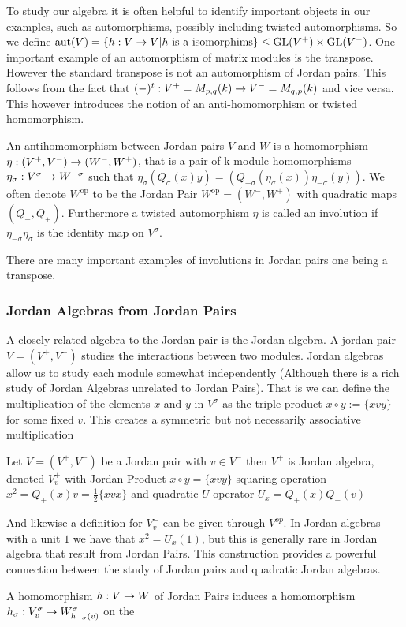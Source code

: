 To study our algebra it is often helpful to identify important objects in our examples, such as automorphisms, possibly including twisted automorphisms.
So we define 
$\text{aut}(V)=\{h:V\rightarrow V| h \text{ is a isomorphims}\}\leq \text{GL}(V^+)\times \text{GL}(V^-)$.  
One important example of an automorphism of matrix modules is the transpose. However the standard transpose is not an automorphism of Jordan pairs.
This follows from the fact that $(-)^t:V^+=M_{p,q}(k)\rightarrow V^-=M_{q,p}(k)$ and vice versa.
This however introduces the notion of an anti-homomorphism or twisted homomorphism.
\begin{definition}
    An antihomomorphism between Jordan pairs $V$ and $W$ is a homomorphism $\eta: (V^+,V^-)\rightarrow(W^-,W^+)$, that is a pair of k-module homomorphisms $\eta_\sigma:V^\sigma\rightarrow W^{-\sigma}$ such that
    $\eta_\sigma (Q_\sigma(x)y)=(Q_{-\sigma}(\eta_\sigma(x))\eta_{-\sigma} (y))$. We often denote $W^{\text{op}}$ to be the Jordan Pair $W^{\text{op}}=(W^-,W^+)$ with quadratic maps $(Q_-,Q_+)$.
    Furthermore a twisted automorphism $\eta$ is called an involution if $\eta_{-\sigma}\eta_\sigma$ is the identity map on $V^\sigma$.
\end{definition}
There are many important examples of involutions in Jordan pairs one being a transpose.

\subsubsection*{Jordan Algebras from Jordan Pairs}
A closely related algebra to the Jordan pair is the Jordan algebra. A jordan pair $V=(V^+,V^-)$ 
studies the interactions between two modules. Jordan algebras allow us to study each module somewhat independently (Although there is a rich study of Jordan Algebras unrelated to Jordan Pairs).
That is we can define the multiplication of the elements $x$ and $y$ in $V^\sigma$ as the triple 
product $x\circ y:=\{xvy\}$ for some fixed $v$. This creates a symmetric but not necessarily associative multiplication

\begin{definition}
    Let $V=(V^+,V^-)$ be a Jordan pair with $v\in V^-$ then $V^+$ is Jordan algebra, denoted $V^+_v$ with
    Jordan Product $x\circ y=\{xvy\}$ squaring operation 
    $x^2=Q_+(x)v=\frac{1}{2}\{xvx\}$ and quadratic $U$-operator 
    $U_x=Q_+(x)Q_-(v)$
\end{definition}
And likewise a definition for $V^-_v$ can be given through $V^{op}$. 
In Jordan algebras with a unit $1$ we have that $x^2=U_x(1)$, but this is generally rare in Jordan algebra that result from Jordan Pairs.
This construction provides a powerful connection between the study of Jordan pairs and quadratic Jordan algebras.

A homomorphism $h:V\rightarrow W$ of Jordan Pairs induces a homomorphism $h_\sigma:V_v^\sigma\rightarrow W^\sigma_{h_{-\sigma}(v)}$ on the 
